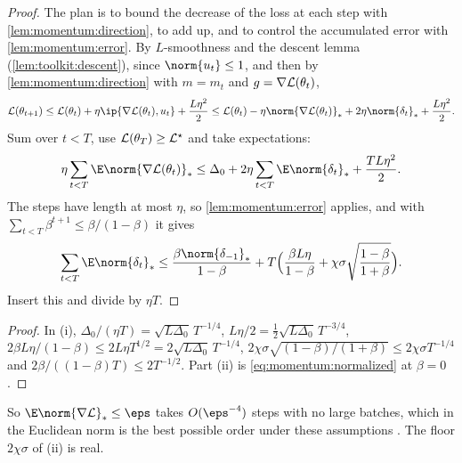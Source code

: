 \begin{refsection}
\begin{proof}
The plan is to bound the decrease of the loss at each step with \cref{lem:momentum:direction}, to add up, and to control the accumulated error with \cref{lem:momentum:error}. By $L$-smoothness and the descent lemma (\cref{lem:toolkit:descent}), since $\norm{u_t}\le1$, and then by \cref{lem:momentum:direction} with $m=m_t$ and $g=\nabla\mathcal{L}(\theta_t)$,
\[
  \Loss(\theta_{t+1})\le\Loss(\theta_t)+\eta\ip{\nabla\Loss(\theta_t),u_t}+\frac{L\eta^2}2\le\Loss(\theta_t)-\eta\norm{\nabla\Loss(\theta_t)}_*+2\eta\norm{\delta_t}_*+\frac{L\eta^2}2.
\]
Sum over $t<T$, use $\mathcal{L}(\theta_T)\ge\mathcal{L}^\star$ and take expectations:
\[
  \eta\sum_{t<T}\E\norm{\nabla\Loss(\theta_t)}_*\le\Delta_0+2\eta\sum_{t<T}\E\norm{\delta_t}_*+\frac{TL\eta^2}2.
\]
The steps have length at most $\eta$, so \cref{lem:momentum:error} applies, and with $\sum_{t<T}\beta^{t+1}\le\beta/(1-\beta)$ it gives
\[
  \sum_{t<T}\E\norm{\delta_t}_*\le\frac{\beta\norm{\delta_{-1}}_*}{1-\beta}+T\Bigl(\frac{\beta L\eta}{1-\beta}+\chi\sigma\sqrt{\frac{1-\beta}{1+\beta}}\Bigr).
\]
Insert this and divide by $\eta T$.
\end{proof}


\begin{proof}
In (i), $\Delta_0/(\eta T)=\sqrt{L\Delta_0}\,T^{-1/4}$, $L\eta/2=\frac12\sqrt{L\Delta_0}\,T^{-3/4}$, $2\beta L\eta/(1-\beta)\le2L\eta T^{1/2}=2\sqrt{L\Delta_0}\,T^{-1/4}$, $2\chi\sigma\sqrt{(1-\beta)/(1+\beta)}\le2\chi\sigma T^{-1/4}$ and $2\beta/((1-\beta)T)\le2T^{-1/2}$. Part (ii) is \eqref{eq:momentum:normalized} at $\beta=0$.
\end{proof}

So $\E\norm{\nabla\Loss}_*\le\eps$ takes $O(\eps^{-4})$ steps with no large batches, which in the Euclidean norm is the best possible order under these assumptions \parencite{ArjevaniEtAl2023}. The floor $2\chi\sigma$ of (ii) is real.


\end{refsection}
